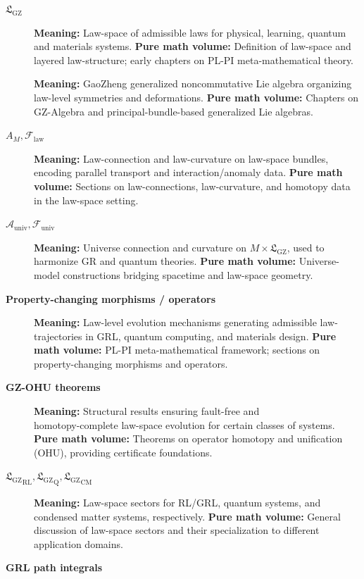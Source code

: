 \documentclass[11pt]{book}
\newcommand{\GAlgebra}{\text{G-Algebra}}
\newcommand{\GZLS}{\ensuremath{\mathfrak{L}_{\mathrm{GZ}}}}
\newcommand{\GZLOC}{\ensuremath{A_M}}
\newcommand{\GZLCurv}{\ensuremath{\mathcal{F}_{\mathrm{law}}}}
\newcommand{\Base}{\ensuremath{M}}
\theoremstyle{plain}
\theoremstyle{definition}
\theoremstyle{remark}
\begin{document}
\begin{description}
  \item[\textbf{$\GZLS$}]
    \textbf{Meaning:} Law-space of admissible laws for physical,
    learning, quantum and materials systems.
    \textbf{Pure math volume:} Definition of law-space and layered
    law-structure; early chapters on PL-PI meta-mathematical theory.
  \item[\textbf{\GAlgebra}]
    \textbf{Meaning:} GaoZheng generalized noncommutative Lie algebra
    organizing law-level symmetries and deformations.
    \textbf{Pure math volume:} Chapters on GZ-Algebra and
    principal-bundle-based generalized Lie algebras.
  \item[\textbf{$\GZLOC,\GZLCurv$}]
    \textbf{Meaning:} Law-connection and law-curvature on law-space
    bundles, encoding parallel transport and interaction/anomaly data.
    \textbf{Pure math volume:} Sections on law-connections,
    law-curvature, and homotopy data in the law-space setting.
  \item[\textbf{$\mathcal{A}_{\mathrm{univ}},
                 \mathcal{F}_{\mathrm{univ}}$}]
    \textbf{Meaning:} Universe connection and curvature on
    $\Base \times \GZLS$, used to harmonize GR and quantum theories.
    \textbf{Pure math volume:} Universe-model constructions bridging
    spacetime and law-space geometry.
  \item[\textbf{Property-changing morphisms / operators}]
    \textbf{Meaning:} Law-level evolution mechanisms generating
    admissible law-trajectories in GRL, quantum computing, and
    materials design.
    \textbf{Pure math volume:} PL-PI meta-mathematical framework;
    sections on property-changing morphisms and operators.
  \item[\textbf{GZ-OHU theorems}]
    \textbf{Meaning:} Structural results ensuring fault-free and \\
    homotopy-complete law-space evolution for certain classes of
    systems.
    \textbf{Pure math volume:} Theorems on operator homotopy and
    unification (OHU), providing certificate foundations.
  \item[\textbf{${\GZLS}_{\mathrm{RL}},
                  {\GZLS}_{\mathrm{Q}},
                  {\GZLS}_{\mathrm{CM}}$}]
    \textbf{Meaning:} Law-space sectors for RL/GRL, quantum systems,
    and condensed matter systems, respectively.
    \textbf{Pure math volume:} General discussion of law-space sectors
    and their specialization to different application domains.
  \item[\textbf{GRL path integrals}]

\end{description}
\end{document}
